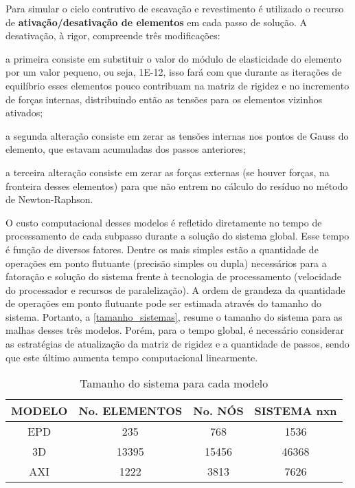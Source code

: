 Para simular o ciclo contrutivo de escavação e revestimento é utilizado o recurso de \textbf{ativação/desativação de elementos} em cada passo de solução. A desativação, à rigor, compreende três modificações:
\begin{alineas}
	
	\item a primeira consiste em substituir o valor do módulo de elasticidade do elemento por um valor pequeno, ou seja, 1E-12, isso fará com que durante as iterações de equilíbrio esses elementos pouco contribuam na matriz de rigidez e no incremento de forças internas, distribuindo então as tensões para os elementos vizinhos ativados;
	
	\item a segunda alteração consiste em zerar as tensões internas nos pontos de Gauss do elemento, que estavam acumuladas dos passos anteriores; 
	
	\item a terceira alteração consiste em zerar as forças externas (se houver forças, na fronteira desses elementos) para que não entrem no cálculo do resíduo no método de Newton-Raphson.
	
\end{alineas}

O custo computacional desses modelos é refletido diretamente no tempo de processamento de cada subpasso durante a solução do sistema global. Esse tempo é função de diversos fatores. Dentre os mais simples estão a quantidade de operações em ponto flutuante (precisão simples ou dupla) necessários para a fatoração e solução do sistema frente à tecnologia de processamento (velocidade do processador e recursos de paralelização). A ordem de grandeza da quantidade de operações em ponto flutuante pode ser estimada através do tamanho do sistema. Portanto, a \autoref{tamanho_sistemas}, resume o tamanho do sistema para as malhas desses três modelos. Porém, para o tempo global, é necessário considerar as estratégias de atualização da matriz de rigidez e a quantidade de passos, sendo que este último aumenta tempo computacional linearmente.

\begin{table}[H]
	\caption{Tamanho do sistema para cada modelo}
	\label{tamanho_sistemas}
	\centering
	\small
	\renewcommand{\arraystretch}{1.25}
	\begin{tabular}{c c c c}
		\hline
		\multicolumn{1}{c}{\textbf{MODELO}} &
		\multicolumn{1}{c}{\textbf{No. ELEMENTOS}} &
		\multicolumn{1}{c}{\textbf{No. NÓS}} &
		\multicolumn{1}{c}{\textbf{SISTEMA nxn}} \\
		\hline
		EPD & 235 & 768 & 1536 \\
		3D & 13395 & 15456 & 46368 \\
		AXI & 1222 & 3813 & 7626 \\
		\hline
	\end{tabular}
	\normalsize
\end{table}